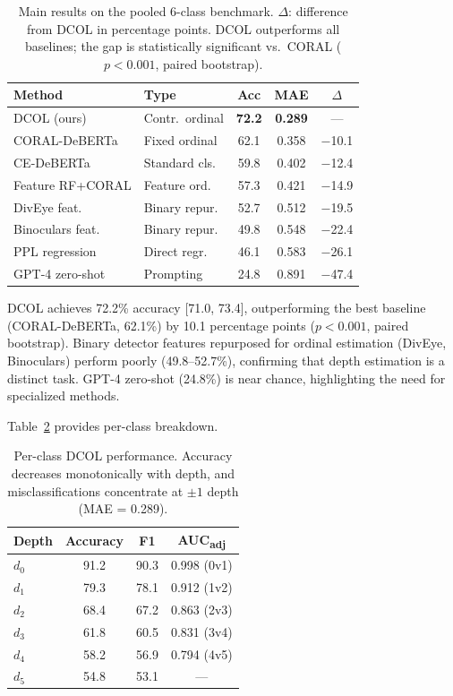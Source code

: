 \documentclass[11pt,a4paper]{article}
\newcommand{\ours}{DCOL}
\begin{document}
\begin{table}[t]
\centering
\small
\begin{tabular}{llccc}
\toprule
\textbf{Method} & \textbf{Type} & \textbf{Acc} & \textbf{MAE} & \textbf{$\Delta$} \\
\midrule
\ours{} (ours) & Contr.\ ordinal & \textbf{72.2} & \textbf{0.289} & --- \\
CORAL-DeBERTa & Fixed ordinal & 62.1 & 0.358 & $-$10.1 \\
CE-DeBERTa & Standard cls. & 59.8 & 0.402 & $-$12.4 \\
Feature RF+CORAL & Feature ord. & 57.3 & 0.421 & $-$14.9 \\
DivEye feat. & Binary repur. & 52.7 & 0.512 & $-$19.5 \\
Binoculars feat. & Binary repur. & 49.8 & 0.548 & $-$22.4 \\
PPL regression & Direct regr. & 46.1 & 0.583 & $-$26.1 \\
GPT-4 zero-shot & Prompting & 24.8 & 0.891 & $-$47.4 \\
\bottomrule
\end{tabular}
\caption{Main results on the pooled 6-class benchmark. $\Delta$: difference from \ours{} in percentage points. \ours{} outperforms all baselines; the gap is statistically significant vs.\ CORAL ($p < 0.001$, paired bootstrap).}
\label{tab:main}
\end{table}

\ours{} achieves 72.2\% accuracy [71.0, 73.4], outperforming the best baseline (CORAL-DeBERTa, 62.1\%) by 10.1 percentage points ($p < 0.001$, paired bootstrap).
Binary detector features repurposed for ordinal estimation (DivEye, Binoculars) perform poorly (49.8--52.7\%), confirming that depth estimation is a distinct task.
GPT-4 zero-shot (24.8\%) is near chance, highlighting the need for specialized methods.

Table~\ref{tab:perclass} provides per-class breakdown.

\begin{table}[t]
\centering
\small
\begin{tabular}{lccc}
\toprule
\textbf{Depth} & \textbf{Accuracy} & \textbf{F1} & \textbf{AUC\textsubscript{adj}} \\
\midrule
$d_0$ & 91.2 & 90.3 & 0.998 (0v1) \\
$d_1$ & 79.3 & 78.1 & 0.912 (1v2) \\
$d_2$ & 68.4 & 67.2 & 0.863 (2v3) \\
$d_3$ & 61.8 & 60.5 & 0.831 (3v4) \\
$d_4$ & 58.2 & 56.9 & 0.794 (4v5) \\
$d_5$ & 54.8 & 53.1 & --- \\
\bottomrule
\end{tabular}
\caption{Per-class \ours{} performance. Accuracy decreases monotonically with depth, and misclassifications concentrate at $\pm 1$ depth (MAE = 0.289).}
\label{tab:perclass}
\end{table}
\end{document}
